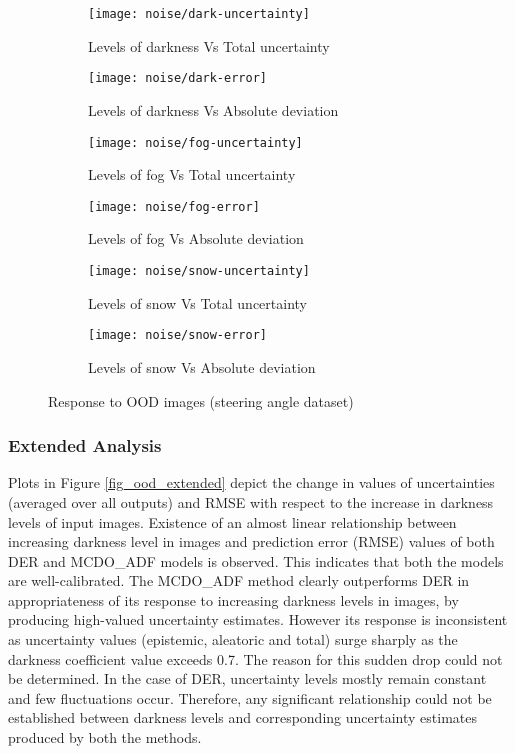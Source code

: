\begin{figure}[H]
	\centering
	\begin{subfigure}[b]{0.4\textwidth}
		\centering
		\texttt{[image: noise/dark-uncertainty]}
		\caption{Levels of darkness Vs Total uncertainty}
		\label{mcdo_fn2}
	\end{subfigure}
	\hfill
	\begin{subfigure}[b]{0.4\textwidth}
		\centering
		\texttt{[image: noise/dark-error]}
		\caption{Levels of darkness Vs Absolute deviation}
		\label{der_fn2}
	\end{subfigure}
	\hfill
	\begin{subfigure}[b]{0.4\textwidth}
		\centering
		\texttt{[image: noise/fog-uncertainty]}
		\caption{Levels of fog Vs Total uncertainty}
		\label{homo_fn3}
	\end{subfigure}
	\hfill
	\begin{subfigure}[b]{0.4\textwidth}
		\centering
		\texttt{[image: noise/fog-error]}
		\caption{Levels of fog Vs Absolute deviation}
		\label{hetero_fn3}
	\end{subfigure}
	\hfill
	\begin{subfigure}[b]{0.4\textwidth}
		\centering
		\texttt{[image: noise/snow-uncertainty]}
		\caption{Levels of snow Vs Total uncertainty}
		\label{mcdo_fn3}
	\end{subfigure}
	\hfill
	\begin{subfigure}[b]{0.4\textwidth}
		\centering
		\texttt{[image: noise/snow-error]}
		\caption{Levels of snow Vs Absolute deviation}
		\label{mcdo_fn3}
	\end{subfigure}
	\hfill
	\caption{Response to OOD images (steering angle dataset)}
	\label{fig_noise_fog}
\end{figure}


\subsubsection{Extended Analysis}\label{ood_extended}
Plots in Figure \ref{fig_ood_extended} depict the change in values of uncertainties (averaged over all outputs) and RMSE with respect to the increase in darkness levels of input images. Existence of an almost linear relationship between increasing darkness level in images and prediction error (RMSE) values of both DER and MCDO\_ADF models is observed. This indicates that both the models are well-calibrated. The MCDO\_ADF method clearly outperforms DER in appropriateness of its response to increasing darkness levels in images, by producing high-valued uncertainty estimates. However its response is inconsistent as uncertainty values (epistemic, aleatoric and total) surge sharply as the darkness coefficient value exceeds 0.7. The reason for this sudden drop could not be determined. In the case of DER, uncertainty levels mostly remain constant and few fluctuations occur. Therefore, any significant relationship could not be established between darkness levels and corresponding uncertainty estimates produced by both the methods. 

